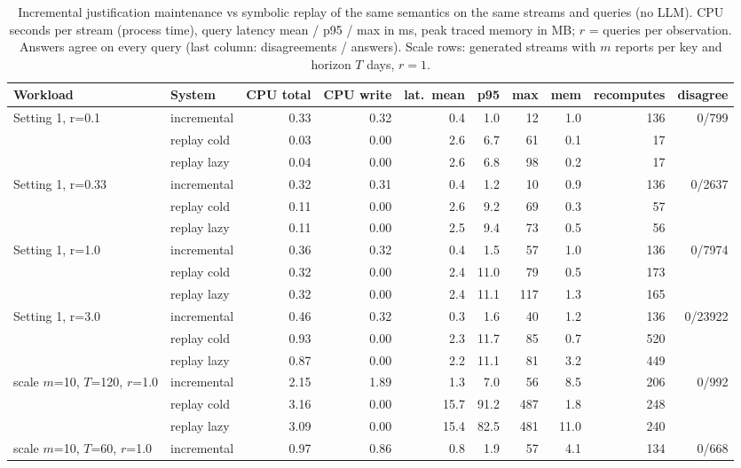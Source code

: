 \begin{table}\centering\small
\caption{Incremental justification maintenance vs symbolic replay of the same semantics on the same streams and queries (no LLM). CPU seconds per stream (process time), query latency mean / p95 / max in ms, peak traced memory in MB; $r$ = queries per observation. Answers agree on every query (last column: disagreements / answers). Scale rows: generated streams with $m$ reports per key and horizon $T$ days, $r=1$.}\label{tab:sys}
\begin{tabular}{llrrrrrrrr}
\toprule
Workload & System & CPU total & CPU write & lat.\ mean & p95 & max & mem & recomputes & disagree \\
\midrule
Setting 1, r=0.1 & incremental & 0.33 & 0.32 & 0.4 & 1.0 & 12 & 1.0 & 136 & 0/799 \\
 & replay cold & 0.03 & 0.00 & 2.6 & 6.7 & 61 & 0.1 & 17 &  \\
 & replay lazy & 0.04 & 0.00 & 2.6 & 6.8 & 98 & 0.2 & 17 &  \\
\addlinespace[2pt]
Setting 1, r=0.33 & incremental & 0.32 & 0.31 & 0.4 & 1.2 & 10 & 0.9 & 136 & 0/2637 \\
 & replay cold & 0.11 & 0.00 & 2.6 & 9.2 & 69 & 0.3 & 57 &  \\
 & replay lazy & 0.11 & 0.00 & 2.5 & 9.4 & 73 & 0.5 & 56 &  \\
\addlinespace[2pt]
Setting 1, r=1.0 & incremental & 0.36 & 0.32 & 0.4 & 1.5 & 57 & 1.0 & 136 & 0/7974 \\
 & replay cold & 0.32 & 0.00 & 2.4 & 11.0 & 79 & 0.5 & 173 &  \\
 & replay lazy & 0.32 & 0.00 & 2.4 & 11.1 & 117 & 1.3 & 165 &  \\
\addlinespace[2pt]
Setting 1, r=3.0 & incremental & 0.46 & 0.32 & 0.3 & 1.6 & 40 & 1.2 & 136 & 0/23922 \\
 & replay cold & 0.93 & 0.00 & 2.3 & 11.7 & 85 & 0.7 & 520 &  \\
 & replay lazy & 0.87 & 0.00 & 2.2 & 11.1 & 81 & 3.2 & 449 &  \\
\addlinespace[2pt]
scale $m$=10, $T$=120, $r$=1.0 & incremental & 2.15 & 1.89 & 1.3 & 7.0 & 56 & 8.5 & 206 & 0/992 \\
 & replay cold & 3.16 & 0.00 & 15.7 & 91.2 & 487 & 1.8 & 248 &  \\
 & replay lazy & 3.09 & 0.00 & 15.4 & 82.5 & 481 & 11.0 & 240 &  \\
\addlinespace[2pt]
scale $m$=10, $T$=60, $r$=1.0 & incremental & 0.97 & 0.86 & 0.8 & 1.9 & 57 & 4.1 & 134 & 0/668 \\

\end{tabular}
\end{table}
